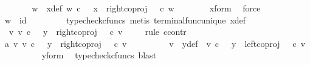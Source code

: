 \begin{isabellebody}
\ \ \ \ \isamarkupfalse%
\ \isamarkupfalse%
\ w\ \ x{\isacharunderscore}{\kern0pt}def{\isacharcolon}{\kern0pt}\ {\isachardoublequoteopen}w\ {\isasymin}\isactrlsub c\ {\isasymone}\ {\isasymand}\ x\ {\isacharequal}{\kern0pt}\ right{\isacharunderscore}{\kern0pt}coproj\ {\isasymone}\ {\isasymone}\ {\isasymcirc}\isactrlsub c\ w{\isachardoublequoteclose}\isanewline
\ \ \ \ \ \ \isamarkupfalse%
\ x{\isacharunderscore}{\kern0pt}form\ \isamarkupfalse%
\ force\isanewline
\ \ \ \ \isamarkupfalse%
\ \isamarkupfalse%
\ {\isachardoublequoteopen}w\ {\isacharequal}{\kern0pt}\ id\ {\isasymone}{\isachardoublequoteclose}\isanewline
\ \ \ \ \ \ \isamarkupfalse%
\ {\isacharparenleft}{\kern0pt}typecheck{\isacharunderscore}{\kern0pt}cfuncs{\isacharcomma}{\kern0pt}\ metis\ terminal{\isacharunderscore}{\kern0pt}func{\isacharunderscore}{\kern0pt}unique\ x{\isacharunderscore}{\kern0pt}def{\isacharparenright}{\kern0pt}\isanewline
\ \ \ \ \isamarkupfalse%
\ {\isachardoublequoteopen}{\isasymexists}\ v{\isachardot}{\kern0pt}\ v\ {\isasymin}\isactrlsub c\ {\isasymone}\ {\isasymand}\ y\ {\isacharequal}{\kern0pt}\ right{\isacharunderscore}{\kern0pt}coproj\ {\isasymone}\ {\isasymone}\ {\isasymcirc}\isactrlsub c\ v{\isachardoublequoteclose}\isanewline
\ \ \ \ \isamarkupfalse%
{\isacharparenleft}{\kern0pt}rule\ ccontr{\isacharparenright}{\kern0pt}\isanewline
\ \ \ \ \ \ \isamarkupfalse%
\ a{}{\isacharcolon}{\kern0pt}\ {\isachardoublequoteopen}{\isasymnexists}v{\isachardot}{\kern0pt}\ v\ {\isasymin}\isactrlsub c\ {\isasymone}\ {\isasymand}\ y\ {\isacharequal}{\kern0pt}\ right{\isacharunderscore}{\kern0pt}coproj\ {\isasymone}\ {\isasymone}\ {\isasymcirc}\isactrlsub c\ v{\isachardoublequoteclose}\isanewline
\ \ \ \ \ \ \isamarkupfalse%
\ \isamarkupfalse%
\ v\ \ y{\isacharunderscore}{\kern0pt}def{\isacharcolon}{\kern0pt}\ \ {\isachardoublequoteopen}v\ {\isasymin}\isactrlsub c\ {\isasymone}\ {\isasymand}\ y\ {\isacharequal}{\kern0pt}\ left{\isacharunderscore}{\kern0pt}coproj\ {\isasymone}\ {\isasymone}\ {\isasymcirc}\isactrlsub c\ v{\isachardoublequoteclose}\isanewline
\ \ \ \ \ \ \ \ \isamarkupfalse%
\ y{\isacharunderscore}{\kern0pt}form\ \isamarkupfalse%
\ {\isacharparenleft}{\kern0pt}typecheck{\isacharunderscore}{\kern0pt}cfuncs{\isacharcomma}{\kern0pt}\ blast{\isacharparenright}{\kern0pt}\isanewline
\ \ \ \ \ \ \isamarkupfalse%

\end{isabellebody}
